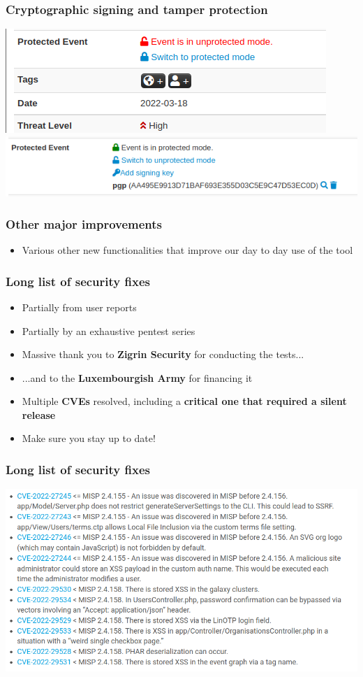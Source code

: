 \begin{frame}
\frametitle{Cryptographic signing and tamper protection}
\includegraphics[scale=0.6]{images/signing3.png}
\includegraphics[scale=0.6]{images/signing4.png}
\end{frame}

\begin{frame}
  \frametitle{Other major improvements}
  \begin{itemize}
      \item Various other new functionalities that improve our day to day use of the tool
  \end{itemize}
\end{frame}

\begin{frame}
  \frametitle{Long list of security fixes}
  \begin{itemize}
      \item Partially from user reports
      \item Partially by an exhaustive pentest series
      \item Massive thank you to {\bf Zigrin Security} for conducting the tests...
      \item ...and to the {\bf Luxembourgish Army} for financing it
      \item Multiple {\bf CVEs} resolved, including a {\bf critical one that required a silent release}
      \item Make sure you stay up to date!
  \end{itemize}
\end{frame}

\begin{frame}
\frametitle{Long list of security fixes}
\includegraphics[scale=0.4]{images/security.png}
\end{frame}


